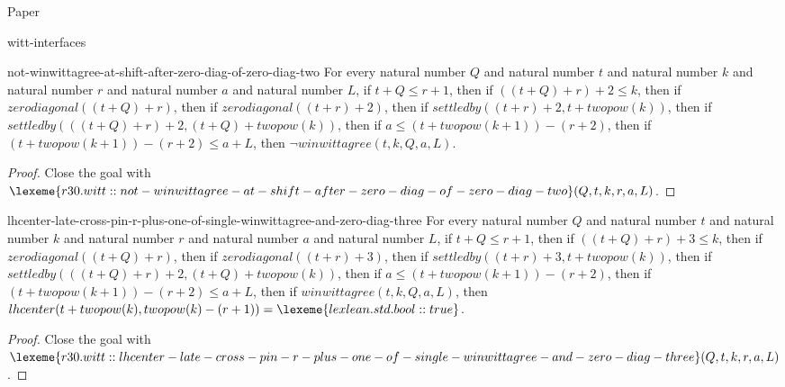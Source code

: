 \begin{lexlean}{Paper}
\begin{section}{witt-interfaces}
  \begin{theorem}{not-winwittagree-at-shift-after-zero-diag-of-zero-diag-two}
  For every natural number \(Q\) and natural number \(t\) and natural number \(k\) and natural number \(r\) and natural number \(a\) and natural number \(L\), if \(t + Q ≤ r + 1\), then if \(((t + Q) + r) + 2 ≤ k\), then if \(zerodiagonal((t + Q) + r)\), then if \(zerodiagonal((t + r) + 2)\), then if \(settledby((t + r) + 2, t + twopow(k))\), then if \(settledby(((t + Q) + r) + 2, (t + Q) + twopow(k))\), then if \(a ≤ (t + twopow(k + 1)) - (r + 2)\), then if \((t + twopow(k + 1)) - (r + 2) ≤ a + L\), then \(¬ winwittagree(t, k, Q, a, L)\).
  \begin{proof}
  Close the goal with \(\lexeme{r30.witt::not-winwittagree-at-shift-after-zero-diag-of-zero-diag-two}(Q, t, k, r, a, L)\).
  \end{proof}
  \end{theorem}

  \begin{theorem}{lhcenter-late-cross-pin-r-plus-one-of-single-winwittagree-and-zero-diag-three}
  For every natural number \(Q\) and natural number \(t\) and natural number \(k\) and natural number \(r\) and natural number \(a\) and natural number \(L\), if \(t + Q ≤ r + 1\), then if \(((t + Q) + r) + 3 ≤ k\), then if \(zerodiagonal((t + Q) + r)\), then if \(zerodiagonal((t + r) + 3)\), then if \(settledby((t + r) + 3, t + twopow(k))\), then if \(settledby(((t + Q) + r) + 2, (t + Q) + twopow(k))\), then if \(a ≤ (t + twopow(k + 1)) - (r + 2)\), then if \((t + twopow(k + 1)) - (r + 2) ≤ a + L\), then if \(winwittagree(t, k, Q, a, L)\), then \(lhcenter(t + twopow(k), twopow(k) - (r + 1)) = \lexeme{lexlean.std.bool::true}\).
  \begin{proof}
  Close the goal with \(\lexeme{r30.witt::lhcenter-late-cross-pin-r-plus-one-of-single-winwittagree-and-zero-diag-three}(Q, t, k, r, a, L)\).
  \end{proof}
  \end{theorem}


\end{section}
\end{lexlean}
